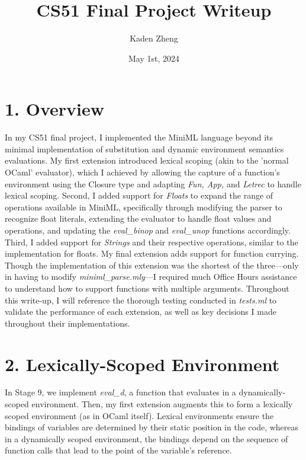 \documentclass[12pt]{article}
\begin{document}
\title{CS51 Final Project Writeup}
\author{Kaden Zheng}
\date{May 1st, 2024}

\maketitle


\section*{1. Overview}
In my CS51 final project, I implemented the MiniML language beyond its minimal implementation of substitution and dynamic environment semantics evaluations. My first extension introduced lexical scoping (akin to the 'normal OCaml' evaluator), which I achieved by allowing the capture of a function's environment using the Closure type and adapting \textit{Fun, App,} and \textit{Letrec} to handle lexical scoping. Second, I added support for \textit{Floats} to expand the range of operations available in MiniML, specifically through modifying the parser to recognize float literals, extending the evaluator to handle float values and operations, and updating the \textit{eval\_binop} and \textit{eval\_unop} functions accordingly. Third, I added support for \textit{Strings} and their respective operations, similar to the implementation for floats. My final extension adds support for function currying. Though the implementation of this extension was the shortest of the three—only in having to modify \textit{miniml\_parse.mly}—I required much Office Hours assistance to understand how to support functions with multiple arguments. Throughout this write-up, I will reference the thorough testing conducted in \textit{tests.ml} to validate the performance of each extension, as well as key decisions I made throughout their implementations. 

\section*{2. Lexically-Scoped Environment}
In Stage 9, we implement \textit{eval\_d}, a function that evaluates in a dynamically-scoped environment. Then, my first extension augments this to form a lexically scoped environment (as in OCaml itself). Lexical environments ensure the bindings of variables are determined by their static position in the code, whereas in a dynamically scoped environment, the bindings depend on the sequence of function calls that lead to the point of the variable's reference.
\end{document}
